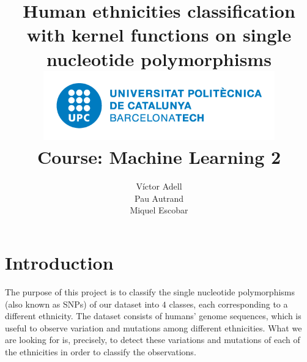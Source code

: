 \documentclass[a4paper, 11pt]{article}
\theoremstyle{definition}
\theoremstyle{remark}
\begin{document}




\title{
\newline
\vspace{3cm}
\textbf{Human ethnicities classification with kernel functions on single nucleotide polymorphisms}\\
\vspace{1cm}
\includegraphics[width=10cm]{UPClogo.png}
\vspace{0.5cm}\\
Course: Machine Learning 2
\vfill
}

\author{
Víctor Adell \\
Pau Autrand \\
Miquel Escobar\\
\vspace{1cm}
}


\clearpage
\maketitle
\thispagestyle{empty}

\newpage
\clearpage






\renewcommand{\cfttoctitlefont}{\Large\bfseries}
\setlength\cftaftertoctitleskip{20pt}
\setlength\cftbeforesecskip{10pt}

\thispagestyle{plain}
\setcounter{page}{2}

\tableofcontents
\newpage
\clearpage






\section{Introduction}


The purpose of this project is to classify the single nucleotide polymorphisms (also known as SNPs) of our dataset into $4$ classes, each corresponding to a different ethnicity. The dataset consists of humans' genome sequences, which is useful to observe variation and mutations among different ethnicities. What we are looking for is, precisely, to detect these variations and mutations of each of the ethnicities in order to classify the observations.
\end{document}
